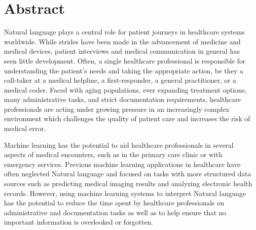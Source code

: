 
\chapter[abstract]{Abstract}

Natural language plays a central role for patient journeys in healthcare systems worldwide. 
While strides have been made in the advancement of medicine and medical devices, patient interviews and medical communication in general has seen little development. 
Often, a single healthcare professional is responsible for understanding the patient's needs and taking the appropriate action, be they a call-taker at a medical helpline, a first-responder, a general practitioner, or a medical coder. 
Faced with aging populations, ever expanding treatment options, many administrative tasks, and strict documentation requirements, healthcare professionals are acting under growing pressure in an increasingly complex environment which challenges the quality of patient care and increases the risk of medical error. 

Machine learning has the potential to aid healthcare professionals in several aspects of medical encounters, such as in the primary care clinic or with emergency services. 
Previous machine learning applications in healthcare have often neglected Natural language and focused on tasks with more structured data sources such as predicting medical imaging results and analyzing electronic health records. 
However, using machine learning systems to interpret Natural language has the potential to reduce the time spent by healthcare professionals on administrative and documentation tasks as well as to help ensure that no important information is overlooked or forgotten. 



